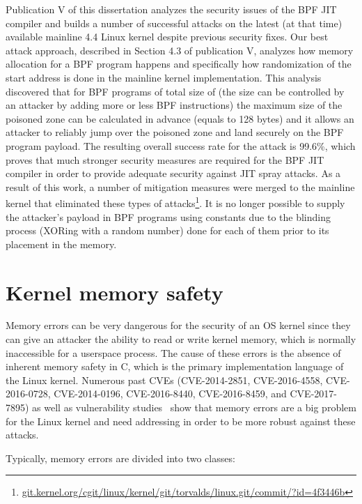 Publication V of this dissertation analyzes the security issues of the BPF JIT compiler and builds a number of successful attacks on the latest (at that time) available mainline 4.4 Linux kernel despite previous security fixes. 
Our best attack approach, described in Section 4.3 of publication V, analyzes how memory allocation for a BPF program happens and specifically how randomization of the start address is done in the mainline kernel implementation. 
This analysis discovered that for BPF programs of total size of  (the size can be controlled by an attacker by adding more or less BPF instructions) the maximum size of the poisoned zone can be calculated in advance (equals to 128 bytes) and it allows an attacker to reliably jump over the poisoned zone and land securely on the BPF program payload. The resulting overall success rate for the attack is 99.6\%, which proves that much stronger security measures are required for the BPF JIT compiler in order to provide adequate security against JIT spray attacks. As a result of this work, a number of mitigation measures were merged to the mainline kernel that eliminated these types of attacks\footnote{\url{git.kernel.org/cgit/linux/kernel/git/torvalds/linux.git/commit/?id=4f3446b}}. It is no longer possible to supply the attacker's payload in BPF programs using constants due to the blinding process (XORing with a random number) done for each of them prior to its placement in the memory.

\section{Kernel memory safety}
\label{sec:kern-mem-safety}

Memory errors can be very dangerous for the security of an OS kernel since they can give an attacker the ability to read or write kernel memory, which is normally inaccessible for a userspace process. The cause of these errors is the absence of inherent memory safety in C, which is the primary implementation language of the Linux kernel. 
Numerous past CVEs (CVE-2014-2851, CVE-2016-4558, CVE-2016-0728, CVE-2014-0196, CVE-2016-8440, CVE-2016-8459, and CVE-2017-7895) as well as vulnerability studies~\cite{raheja2016analysis, chen2011linux} show that memory errors are a big problem for the Linux kernel and need addressing in order to be more robust against these attacks.

Typically, memory errors are divided into two classes:

